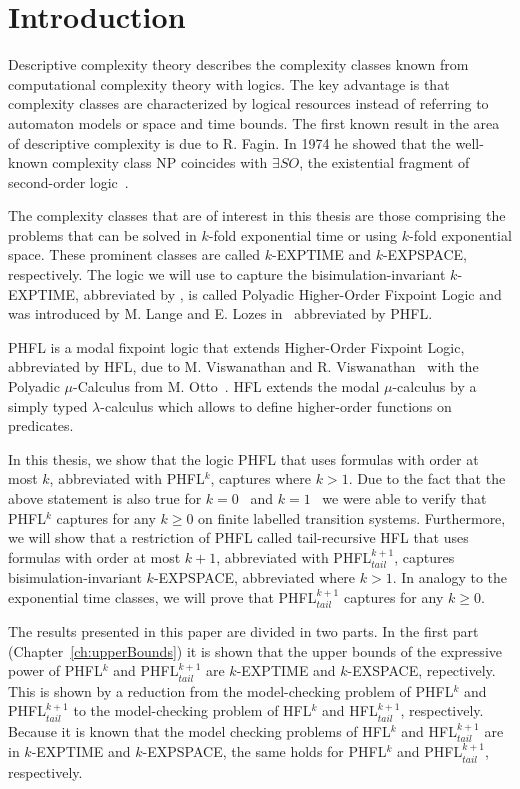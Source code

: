\chapter{Introduction}\label{ch:introduction}

Descriptive complexity theory describes the complexity classes known from computational complexity theory with logics. The key advantage is that complexity classes are characterized by logical resources instead of referring to automaton models or space and time bounds. The first known result in the area of descriptive complexity is due to R. Fagin. In 1974 he showed that the well-known complexity class NP coincides with $\exists SO$, the existential fragment of second-order logic~\cite{fagin1974generalized}. 

The complexity classes that are of interest in this thesis are those comprising the problems that can be solved in $k$-fold exponential time or using $k$-fold exponential space. These prominent classes are called $k$-EXPTIME and $k$-EXPSPACE, respectively. The logic we will use to capture the bisimulation-invariant $k$-EXPTIME, abbreviated by , is called Polyadic Higher-Order Fixpoint Logic and was introduced by M. Lange and E. Lozes in~\cite{lange2014capturing} abbreviated by PHFL. 

PHFL is a modal fixpoint logic that extends Higher-Order Fixpoint Logic, abbreviated by HFL, due to M. Viswanathan and R. Viswanathan~\cite{viswanathan2004higher} with the Polyadic $\mu$-Calculus from M. Otto~\cite{otto1999bisimulation}. HFL extends the modal $\mu$-calculus by a simply typed $\lambda$-calculus which allows to define higher-order functions on predicates.

In this thesis, we show that the logic PHFL that uses formulas with order at most $k$, abbreviated with PHFL$^k$, captures  where $k > 1$. Due to the fact that the above statement is also true for $k = 0$~\cite{otto1999bisimulation} and $k = 1$~\cite{lange2014capturing} we were able to verify that PHFL$^k$ captures  for any $k \geq 0$ on finite labelled transition systems. Furthermore, we will show that a restriction of PHFL called tail-recursive HFL that uses formulas with order at most $k+1$, abbreviated with PHFL$^{k+1}_{tail}$, captures bisimulation-invariant $k$-EXPSPACE, abbreviated  where $k > 1$. In analogy to the exponential time classes, we will prove that PHFL$^{k+1}_{tail}$ captures  for any $k \geq 0$. 

The results presented in this paper are divided in two parts. In the first part (Chapter~\ref{ch:upperBounds}) it is shown that the upper bounds of the expressive power of PHFL$^k$ and PHFL$^{k+1}_{tail}$ are $k$-EXPTIME and $k$-EXSPACE, repectively. This is shown by a reduction from the model-checking problem of PHFL$^k$ and PHFL$^{k+1}_{tail}$ to the model-checking problem of HFL$^k$ and HFL$^{k+1}_{tail}$, respectively. Because it is known that the model checking problems of HFL$^k$ and HFL$^{k+1}_{tail}$ are in $k$-EXPTIME and $k$-EXPSPACE, the same holds for PHFL$^k$ and PHFL$^{k+1}_{tail}$, respectively.

